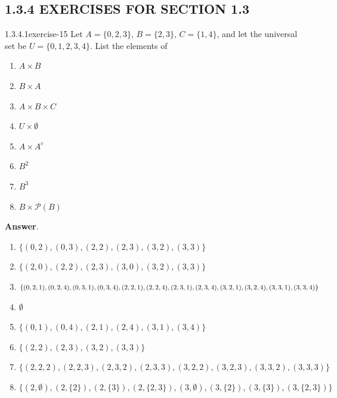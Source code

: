 \documentclass[twoside,10pt,]{book}
\numberwithin{equation}{section}
\begin{document}
\subsection*{1.3.4 EXERCISES FOR SECTION 1.3}
\begin{divisionsolution}{1.3.4.1}{}{exercise-15}%
\hypertarget{p-358}{}%
Let \(A = \{0, 2, 3\}\), \(B = \{2, 3\}\), \(C = \{1, 4\}\), and let the universal set be \(U = \{0, 1, 2, 3, 4\}\). List the elements of%
\par
\hypertarget{p-359}{}%
\leavevmode%
\begin{multicols}{2}
\begin{enumerate}[label=(\alph*)]
\item\hypertarget{li-271}{}\hypertarget{p-360}{}%
\(A \times B\)%
\item\hypertarget{li-272}{}\hypertarget{p-361}{}%
\(B \times  A\)%
\item\hypertarget{li-273}{}\hypertarget{p-362}{}%
\(A \times B\times C\)%
\item\hypertarget{li-274}{}\hypertarget{p-363}{}%
\(U \times \emptyset\)%
\item\hypertarget{li-275}{}\hypertarget{p-364}{}%
\(A \times  A^c\)%
\item\hypertarget{li-276}{}\hypertarget{p-365}{}%
\(B^2\)%
\item\hypertarget{li-277}{}\hypertarget{p-366}{}%
\(B^3\)%
\item\hypertarget{li-278}{}\hypertarget{p-367}{}%
\(B\times \mathcal{P}(B)\)%
\end{enumerate}
\end{multicols}
%
\par\smallskip%
\noindent\textbf{Answer}.\quad%
\hypertarget{p-368}{}%
\leavevmode%
\begin{enumerate}[label=(\alph*)]
\item\hypertarget{li-279}{}\(\{(0, 2), (0, 3), (2, 2), (2, 3), (3, 2), (3, 3)\}\)%
\item\hypertarget{li-280}{}\(\{(2, 0), (2, 2), (2, 3), (3, 0), (3, 2), (3, 3)\}\)%
\item\hypertarget{li-281}{}\(\{(0, 2, 1), (0, 2, 4), (0, 3, 1), (0, 3, 4), (2, 2, 1), (2, 2, 4),\\ (2, 3, 1), (2, 3, 4), (3, 2, 1), (3, 2, 4), (3, 3, 1), (3, 3, 4)\}\)%
\item\hypertarget{li-282}{}\(\emptyset\)%
\item\hypertarget{li-283}{}\(\{(0, 1), (0, 4), (2, 1), (2, 4), (3, 1), (3, 4)\}\)%
\item\hypertarget{li-284}{}\(\{(2, 2), (2, 3), (3, 2), (3, 3)\}\)%
\item\hypertarget{li-285}{}\(\{(2, 2, 2), (2, 2, 3), (2, 3, 2), (2, 3, 3), (3, 2, 2), (3, 2, 3), (3, 3, 2), (3, 3, 3)\}\)%
\item\hypertarget{li-286}{}\(\{(2, \emptyset ), (2, \{2\}), (2, \{3\}), (2, \{2, 3\}), (3, \emptyset ), (3, \{2\}), (3, \{3\}), (3, \{2, 3\})\}\)%
\end{enumerate}
%
\end{divisionsolution}%
\end{document}
